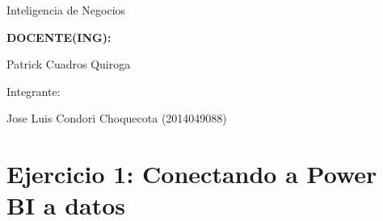 \documentclass[12pt,letterpaper]{article}
\begin{document}
\begin{titlepage}
\begin{center}
\vspace*{0.1in}
\begin{large}
Inteligencia de Negocios\\
\end{large}

\vspace*{0.3in}
\begin{Large}
\textbf{DOCENTE(ING):} \\
\end{Large}

\vspace*{0.1in}
\begin{large}
 Patrick Cuadros Quiroga\\
\end{large}

\vspace*{0.2in}
\vspace*{0.1in}
\begin{large}
Integrante: \\
\begin{flushleft}
Jose Luis Condori Choquecota         	\hfill	(2014049088) \\

\end{flushleft}
\end{large}
\end{center}

\end{titlepage}


\tableofcontents %
\thispagestyle{empty} %
\newpage
\setcounter{page}{1} %


\section{Ejercicio 1:  Conectando a Power BI a datos}
\end{document}
